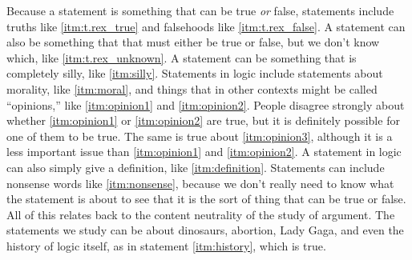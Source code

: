 Because a statement is something that can be true \emph{or} false, statements include truths like \ref{itm:t.rex_true} and falsehoods like \ref{itm:t.rex_false}. A statement can also be something that that must either be true or false, but we don't know which, like \ref{itm:t.rex_unknown}. A statement can be something that is completely silly, like \ref{itm:silly}. Statements in logic include statements about morality, like \ref{itm:moral}, and things that in other contexts might be called ``opinions,'' like \ref{itm:opinion1} and \ref{itm:opinion2}. People disagree strongly about whether \ref{itm:opinion1} or \ref{itm:opinion2} are true, but it is definitely possible for one of them to be true. The same is true about \ref{itm:opinion3}, although it is a less important issue than \ref{itm:opinion1} and \ref{itm:opinion2}. A statement in logic can also simply give a definition, like \ref{itm:definition}.  Statements can include nonsense words like \ref{itm:nonsense}, because we don't really need to know what the statement is about to see that it is the sort of thing that can be true or false. All of this relates back to the content neutrality of the study of argument. The statements we study can be about dinosaurs, abortion, Lady Gaga, and even the history of logic itself, as in statement \ref{itm:history}, which is true.



